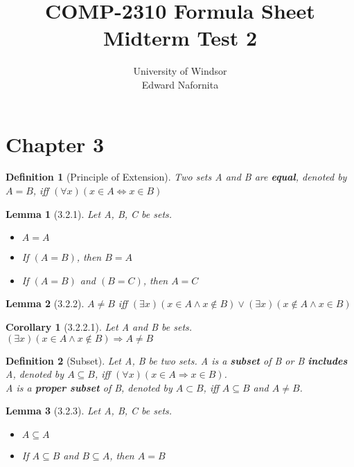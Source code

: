 \documentclass[12pt, letterpaper]{article}
\title{COMP-2310 Formula Sheet \\ Midterm Test 2}
\author{University of Windsor \\ Edward Nafornita}
\theoremstyle{plain}
\newtheorem*{lemma*}{Lemma}
\newtheorem*{corollary*}{Corollary}
\newtheorem*{definition*}{Definition}
\begin{document}
\maketitle{}
\newpage
\section*{Chapter 3}
    \begin{mdframed}[leftmargin=0.01cm, rightmargin=0.01cm]
        \begin{definition*}[Principle of Extension]
            Two sets A and B are \textbf{equal}, denoted by $A = B$, iff $(\forall x)(x \in A \Leftrightarrow x \in B)$
        \end{definition*}
        \begin{lemma*}[3.2.1]
            Let A, B, C be sets.
            \begin{itemize}
                \item[(i)] $A = A$
                \item[(ii)] If $(A = B)$, then $B = A$
                \item[(iii)] If $(A = B)$ and $(B = C)$, then $A = C$
            \end{itemize}
        \end{lemma*}
        \begin{lemma*}[3.2.2]
            $A \neq B$ iff $(\exists x)(x \in A \wedge x \notin B) \vee (\exists x)(x \notin A \wedge x \in B)$
        \end{lemma*}
        \begin{corollary*}[3.2.2.1]
            Let A and B be sets. \\
            $(\exists x)(x \in A \wedge x \notin B) \Rightarrow A \neq B$
        \end{corollary*}
        \begin{definition*}[Subset]
            Let A, B be two sets. A is a \textbf{subset} of B or B \textbf{includes} A, denoted by $A \subseteq B$, iff $(\forall x)(x \in A \Rightarrow x \in B)$. \\
            A is a \textbf{proper subset} of B, denoted by $A \subset B$, iff $A \subseteq B$ and $A \neq B$.
        \end{definition*}
        \begin{lemma*}[3.2.3]
            Let A, B, C be sets.
            \begin{itemize}
                \item[(i)] $A \subseteq A$
                \item[(ii)] If $A \subseteq B$ and $B \subseteq A$, then $A = B$

\end{itemize}
\end{lemma*}
\end{mdframed}
\end{document}
